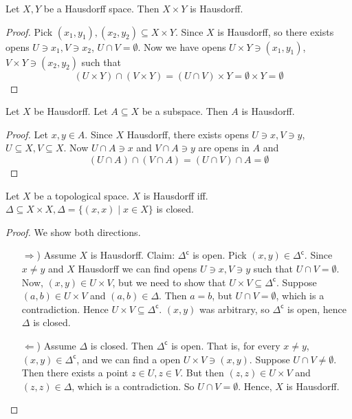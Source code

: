 \begin{theorem}
    Let \( X, Y \) be a Hausdorff space.
    Then \( X \times Y \) is Hausdorff.
\end{theorem}

\begin{proof}
  Pick \( (x_1, y_1), (x_2, y_2) \subseteq X \times Y \).
  Since \( X \) is Hausdorff, so
  there exists opens \( U \ni x_1, V \ni x_2 \), \( U \cap V = \emptyset \).
  Now we have opens \( U \times Y \ni (x_1, y_1) \), 
  \( V \times Y \ni (x_2, y_2) \) such that
  \[
    (U \times Y) \cap (V \times Y)
    = (U \cap V) \times Y
    = \emptyset \times Y
    = \emptyset
  \]
\end{proof}

\begin{theorem}
   Let \( X \) be Hausdorff.
   Let \( A \subseteq X \) be a subspace.
   Then \( A \) is Hausdorff.
\end{theorem}

\begin{proof}
  Let \( x, y \in A \).
  Since \( X \) Hausdorff, there exists
  opens \( U \ni x, V \ni y \),
  \( U \subseteq X, V \subseteq X \).
  Now \( U \cap A \ni x \) and \( V \cap A \ni y \)
  are opens in \( A \) and
  \[
    (U \cap A) \cap (V \cap A) = (U \cap V) \cap A = \emptyset
  \]
\end{proof}

\begin{theorem}
    Let \( X \) be a topological space.
    \( X \) is Hausdorff iff. \( \Delta \subseteq X \times X, \Delta = \{ (x, x) \mid x\in X \} \)
    is closed.
\end{theorem}

\begin{proof}
   We show both directions.
   \begin{enumerate}
     \item[\( \Rightarrow \))]
       Assume \( X \) is Hausdorff.
       Claim: \( \Delta^\mathsf{c} \) is open.
      Pick \( (x, y) \in \Delta^\mathsf{c} \).
      Since \( x \neq y \) and \( X \) Hausdorff
      we can find opens \( U \ni x, V \ni y \) such that
      \( U \cap V = \emptyset \). Now, \( (x, y) \in U \times V \),
      but we need to show that \( U \times V \subseteq \Delta ^\mathsf{c} \).
      Suppose \( (a, b) \in U \times V \) and \( (a, b) \in \Delta \).
      Then \( a = b \), but \( U \cap V = \emptyset \), which is a contradiction.
      Hence \( U \times V \subseteq \Delta^\mathsf{c} \).
      \( (x, y) \) was arbitrary, so \( \Delta^\mathsf{c} \) is open,
      hence \( \Delta \) is closed.
     \item[\( \Leftarrow \))]
       Assume \( \Delta \) is closed.
       Then \( \Delta^\mathsf{c} \) is open.
       That is, for every \( x \neq y \),
       \( (x, y) \in \Delta^\mathsf{c} \),
       and we can find a open \( U \times V \ni (x, y) \).
       Suppose \( U \cap V \neq \emptyset \).
       Then there exists a point \( z \in U, z \in V \).
       But then \( (z, z) \in U \times V \) and \( (z, z) \in \Delta \),
       which is a contradiction. So \( U \cap V = \emptyset \).
       Hence, \( X \) is Hausdorff.
   \end{enumerate}
\end{proof}

